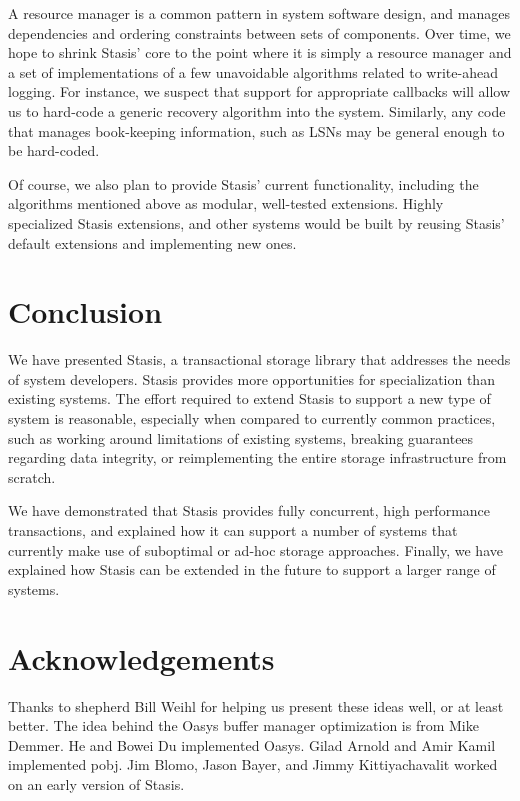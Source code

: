 \documentclass[letterpaper,twocolumn,10pt]{article}
\newcommand{\yad}{Stasis\xspace}
\newcommand{\yads}{Stasis'\xspace}
\newcommand{\oasys}{Oasys\xspace}
\begin{document}
A resource manager
is a common pattern in system software design, and manages
dependencies and ordering constraints between sets of components.
Over time, we hope to shrink \yads core to the point where it is
simply a resource manager and a set of implementations of a few unavoidable
algorithms related to write-ahead logging.  For instance, 
we suspect that support for appropriate callbacks will 
allow us to hard-code a generic recovery algorithm into the 
system.  Similarly, any code that manages book-keeping information, such as 
LSNs may be general enough to be hard-coded.  

Of course, we also plan to provide \yads current functionality, including the algorithms
mentioned above as modular, well-tested extensions.
Highly specialized \yad extensions, and other systems would be built
by reusing \yads default extensions and implementing new ones.


\section{Conclusion}

We have presented \yad, a transactional storage library that addresses
the needs of system developers.  \yad provides more opportunities for
specialization than existing systems.  The effort required to extend
\yad to support a new type of system is reasonable, especially when
compared to currently common practices, such as working around
limitations of existing systems, breaking guarantees regarding data
integrity, or reimplementing the entire storage infrastructure from
scratch.

We have demonstrated that \yad provides fully
concurrent, high performance transactions, and explained how it can
support a number of systems that currently make use of suboptimal or
ad-hoc storage approaches.  Finally, we have explained how \yad can be
extended in the future to support a larger range of systems.

\section{Acknowledgements}

Thanks to shepherd Bill Weihl for helping us present these ideas well,
or at least better. The idea behind the \oasys buffer manager
optimization is from Mike Demmer.  He and Bowei Du implemented \oasys.
Gilad Arnold and Amir Kamil implemented
 pobj.  Jim Blomo, Jason Bayer, and Jimmy
Kittiyachavalit worked on an early version of \yad.
\end{document}
